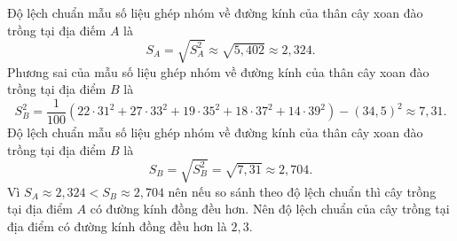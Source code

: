 \begin{bt}
{$$		$$
		Độ lệch chuẩn mẫu số liệu ghép nhóm về đường kính của thân cây xoan đào trồng tại địa điếm $A$ là
		$$
		S_A=\sqrt{S_A^2} \approx \sqrt{5{,}402} \approx 2{,}324.
		$$
		Phương sai của mẫu số liệu ghép nhóm về đường kính của thân cây xoan đào trồng tại địa điểm $B$ là
		$$
		S_B^2=\dfrac{1}{100}\left(22 \cdot 31^2+27 \cdot 33^2+19\cdot 35^2+18 \cdot 37^2+14\cdot 39^2\right)-(34{,}5)^2 \approx 7{,}31.
		$$
		Độ lệch chuẩn mẫu số liệu ghép nhóm về đường kính của thân cây xoan đào trồng tại địa điểm $B$ là
		$$
		S_B=\sqrt{S_B^2}=\sqrt{7{,}31} \approx 2{,}704.
		$$
		Vì $S_A\approx 2{,}324< S_B\approx 2{,}704$ nên nếu so sánh theo độ lệch chuẩn thì cây trồng tại địa điểm $A$ có đường kính đồng đều hơn.
		Nên độ lệch chuẩn của cây trồng tại địa điểm có đường kính đồng đều hơn là $2{,}3$.
	}
\end{bt}

